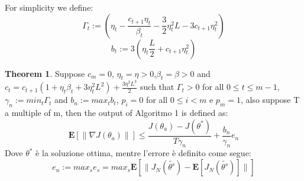 \documentclass{article}
\theoremstyle{remark}
\theoremstyle{definition}
\begin{document}
For simplicity we define:
\begin{displaymath}\Gamma_t := (\eta_t - \frac{c_{t+1}\eta_t}{\beta_t}-\frac{3}{2}\eta_t^2L-3c_{t+1}\eta_t^2)\end{displaymath}
\begin{displaymath}b_t := 3(\eta_t\frac{L}{2} + c_{t+1}\eta_t^2)\end{displaymath}
\newtheorem{thm8}{Theorem}
\begin{thm8} Suppose $c_m=0$, $\eta_t=\eta>0$,$\beta_t=\beta>0$ and $c_t=c_{t+1}(1 + \eta_{t}\beta_{t} + 3\eta^{2}_{t}L^2)+\frac{3\eta^2L^3}{2}$ such that $\Gamma_t>0$ for all $0\leq t \leq m-1$,  $\gamma_n:=min_t \Gamma_t$ and $b_n := max_t b_t$, $p_i=0$ for all $0 \leq i < m$ e $p_m=1$, also suppose T a multiple of m, then the output of Algoritmo 1 is defined as:
\begin{displaymath}\mathbf{E}[\|\nabla J(\theta_a)\|] \leq \frac{J(\theta_a)-J(\theta^*)}{T\gamma_n} + \frac{b_n}{\gamma_n}e_n\end{displaymath}
Dove $\theta^*$ è la soluzione ottima, mentre l'errore è definito come segue: \begin{displaymath}e_n:=max_s e_s =max_s\mathbf{E}\left[\|J_N(\tilde{\theta^s})-\mathbf{E}[J_N(\tilde{\theta^s})]\|\right]\end{displaymath}
\end{thm8}






\appendix
\end{document}
